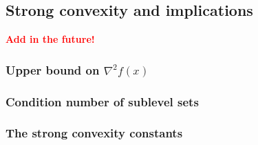 \subsection{Strong convexity and implications}
\textcolor{red}{\textbf{Add in the future!}}
\subsubsection{Upper bound on $\nabla^2f(x)$}
\subsubsection{Condition number of sublevel sets}
\begin{example}
\end{example}
\subsubsection{The strong convexity constants}


